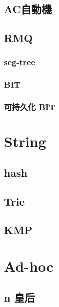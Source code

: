 \subsection{AC自動機}



\subsection{RMQ}
\subsubsection{seg-tree}


\subsubsection{BIT}


\subsubsection{可持久化 BIT}


% 

\section{String}

\subsection{hash}


\subsection{Trie}


\subsection{KMP}


\section{Ad-hoc}

\subsection{n 皇后}

